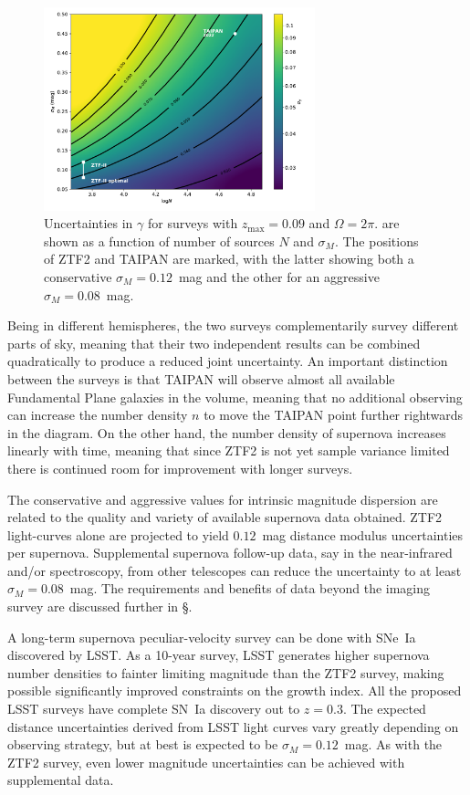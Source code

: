 \documentclass[11pt, oneside]{article}   	%
\begin{document}
\begin{figure}
\centering
\includegraphics[width=0.7\textwidth]{src/surface1.pdf}
\caption{Uncertainties in $\gamma$ for surveys  with $z_{\text{max}}=0.09$ and $\Omega = 2\pi$.
are shown as a function of number of sources $N$ and $\sigma_M$.  The positions of ZTF2 and TAIPAN are marked,
with the latter showing both  a conservative $\sigma_M=0.12$~mag and the other for an aggressive $\sigma_M=0.08$~mag.
\label{surface:fig}}
\end{figure}

Being in different hemispheres, the two surveys
complementarily survey different parts of sky, meaning that their two independent results can be
combined  quadratically to produce a reduced joint uncertainty.  An important distinction between the surveys is
that TAIPAN will observe almost all available Fundamental Plane galaxies in the volume, meaning that no additional observing can
increase the number density $n$ to
move the TAIPAN point further rightwards in the diagram.  On the other hand, the number density of supernova increases
linearly with time, meaning that since ZTF2 is not yet sample variance limited there is continued room for improvement with longer surveys.


The conservative and aggressive values for intrinsic magnitude dispersion are related to the quality and variety of available supernova
data
obtained.  ZTF2 light-curves alone are projected to yield $0.12$~mag distance modulus uncertainties per supernova.
Supplemental supernova follow-up data, say in the near-infrared and/or
spectroscopy, from other telescopes can reduce the uncertainty to at least $\sigma_M=0.08$~mag.  The requirements
and benefits of data beyond the imaging survey are discussed further in \S.

A long-term supernova peculiar-velocity survey can be done with SNe~Ia discovered by LSST.
As a 10-year survey, LSST generates higher supernova number densities to fainter limiting magnitude than the ZTF2 survey,
making possible significantly improved constraints on the growth index.
All the proposed LSST surveys have complete SN~Ia discovery out to $z=0.3$.
The expected distance uncertainties derived from LSST light curves vary greatly depending on observing strategy, but at best
is expected to be $\sigma_M=0.12$~mag.    As with the ZTF2 survey, even lower magnitude uncertainties
can be achieved with supplemental data.
\end{document}
